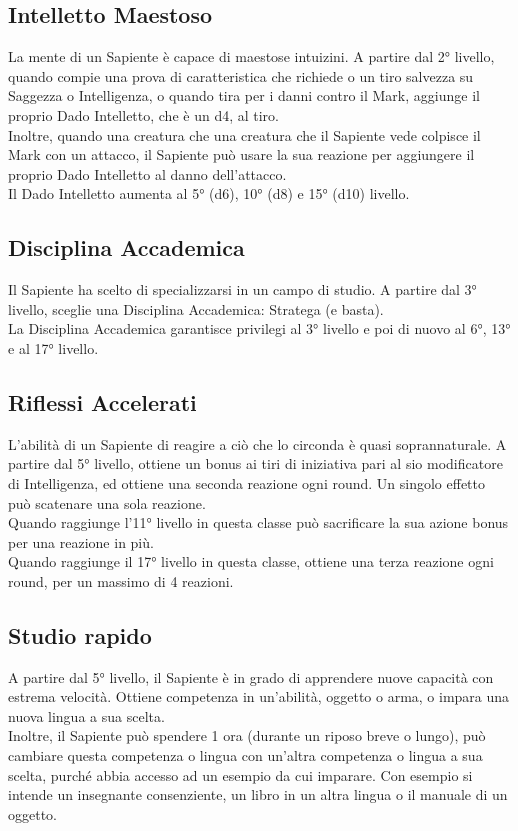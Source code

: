 \subsection{Intelletto Maestoso}
La mente di un Sapiente è capace di maestose intuizini. A partire dal 2° livello, quando compie una prova di caratteristica che richiede o un tiro salvezza su Saggezza o Intelligenza, o quando tira per i danni contro il Mark, aggiunge il proprio Dado Intelletto, che è un d4, al tiro. \\
Inoltre, quando una creatura che una creatura che il Sapiente vede colpisce il Mark con un attacco, il Sapiente può usare la sua reazione per aggiungere il proprio Dado Intelletto al danno dell'attacco. \\
Il Dado Intelletto aumenta al 5° (d6), 10° (d8) e 15° (d10) livello.

\subsection{Disciplina Accademica}
Il Sapiente ha scelto di specializzarsi in un campo di studio. A partire dal 3° livello, sceglie una Disciplina Accademica: Stratega (e basta).\\ La Disciplina Accademica garantisce privilegi al 3° livello e poi di nuovo al 6°, 13° e al 17° livello.

\subsection{Riflessi Accelerati}
L'abilità di un Sapiente di reagire a ciò che lo circonda è quasi soprannaturale. A partire dal 5° livello, ottiene un bonus ai tiri di iniziativa pari al sio modificatore di Intelligenza, ed ottiene una seconda reazione ogni round. Un singolo effetto può scatenare una sola reazione. \\
Quando raggiunge l'11° livello in questa classe può sacrificare la sua azione bonus per una reazione in più.\\
Quando raggiunge il 17° livello in questa classe, ottiene una terza reazione ogni round, per un massimo di 4 reazioni.

\subsection{Studio rapido}
A partire dal 5° livello, il Sapiente è in grado di apprendere nuove capacità con estrema velocità. Ottiene competenza in un'abilità, oggetto o arma, o impara una nuova lingua a sua scelta. \\
Inoltre, il Sapiente può spendere 1 ora (durante un riposo breve o lungo), può cambiare questa competenza o lingua con un'altra competenza o lingua a sua scelta, purché abbia accesso ad un esempio da cui imparare. Con esempio si intende un insegnante consenziente, un libro in un altra lingua o il manuale di un oggetto.

